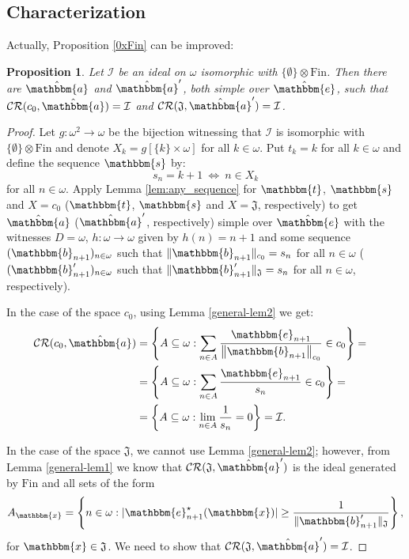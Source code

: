 \documentclass{amsart}
\newcommand{\I}{\mathcal{I}}
\newcommand{\Fin}{\mathrm{Fin}}
\newcommand{\CR}{\mathcal{CR}}
\newcommand{\w}{\mathbbm}
\newtheorem{proposition}[theorem]{Proposition}
\begin{document}
\subsection{Characterization}

Actually, Proposition \ref{0xFin} can be improved:

\begin{proposition}
\label{0xFin-lepsze}
Let $\I$ be an ideal on $\omega$ isomorphic with $\{\emptyset\}\otimes\Fin$. Then there are $\hat{\w{a}}$ and $\hat{\w{a}}'$, both simple over $\hat{\w{e}}$, such that $\CR(c_0,\hat{\w{a}})=\I$ and $\CR(\mathfrak{J},\hat{\w{a}}')=\I$.
\end{proposition}

\begin{proof}
Let $g:\omega^2\to\omega$ be the bijection witnessing that $\I$ is isomorphic with $\{\emptyset\}\otimes\Fin$ and denote $X_k=g[\{k\}\times\omega]$ for all $k\in\omega$. Put $t_k=k$ for all $k\in\omega$ and define the sequence $\w{s}$ by:
\[
s_n=k+1\ \Longleftrightarrow\ n\in X_k
\]
for all $n\in\omega$. Apply Lemma \ref{lem:any_sequence} for $\w{t}$, $\w{s}$ and $X=c_0$ ($\w{t}$, $\w{s}$ and $X=\mathfrak{J}$, respectively) to get $\hat{\w{a}}$ ($\hat{\w{a}}'$, respectively) simple over $\hat{\w{e}}$ with the witnesses $D=\omega$, $h:\omega\to\omega$ given by $h(n)=n+1$ and some sequence $(\w{b}_{n+1})_{n\in\omega}$ such that $\|\w{b}_{n+1}\|_{c_0}=s_n$ for all $n\in\omega$ ($(\w{b}'_{n+1})_{n\in\omega}$ such that $\|\w{b}'_{n+1}\|_{\mathfrak{J}}=s_n$ for all $n\in\omega$, respectively).

In the case of the space $c_0$, using Lemma \ref{general-lem2} we get:
\begin{align*}
\CR(c_0,\hat{\w{a}}) & =\left\{A\subseteq\omega: \sum_{n\in A}\frac{\w{e}_{n+1}}{\left\|\w{b}_{n+1}\right\|_{c_0}}\in c_0\right\}=\cr
& =\left\{A\subseteq\omega: \sum_{n\in A}\frac{\w{e}_{n+1}}{s_n}\in c_0\right\}=\cr
& =\left\{A\subseteq\omega: \lim_{n\in A}\frac{1}{s_n}=0\right\}=\I.   
\end{align*}

In the case of the space $\mathfrak{J}$, we cannot use Lemma \ref{general-lem2}; however, from Lemma \ref{general-lem1} we know that $\CR(\mathfrak{J},\hat{\w{a}}')$ is the ideal generated by $\Fin$ and all sets of the form
    \[
    A_{\w{x}}=\left\{n\in \omega: |\w{e}^\star_{n+1}(\w{x})|\geq\frac{1}{\|\w{b}'_{n+1}\|_{\mathfrak{J}}}\right\},
    \]
for $\w{x}\in \mathfrak{J}$. We need to show that $\CR(\mathfrak{J},\hat{\w{a}}')=\I$.


\end{proof}
\end{document}
